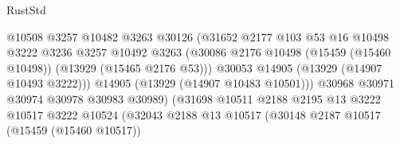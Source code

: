 \begin{lexlean}{RustStd}
\begin{coremodule}
                                            @10508
                                            @3257
                                            @10482
                                            @3263
                                            @30126
                                            (@31652
                                              @2177
                                              @103
                                              @53
                                              @16
                                              @10498
                                              @3222
                                              @3236
                                              @3257
                                              @10492
                                              @3263
                                              (@30086
                                                @2176
                                                @10498
                                                (@15459 (@15460 @10498))
                                                (@13929 (@15465 @2176 @53)))
                                              @30053
                                              @14905
                                              (@13929 (@14907 @10493 @3222)))
                                            @14905
                                            (@13929 (@14907 @10483 @10501)))
                                          @30968
                                          @30971
                                          @30974
                                          @30978
                                          @30983
                                          @30989)
                                        (@31698
                                          @10511
                                          @2188
                                          @2195
                                          @13
                                          @3222
                                          @10517
                                          @3222
                                          @10524
                                          (@32043
                                            @2188
                                            @13
                                            @10517
                                            (@30148
                                              @2187
                                              @10517
                                              (@15459 (@15460 @10517))

\end{coremodule}
\end{lexlean}
